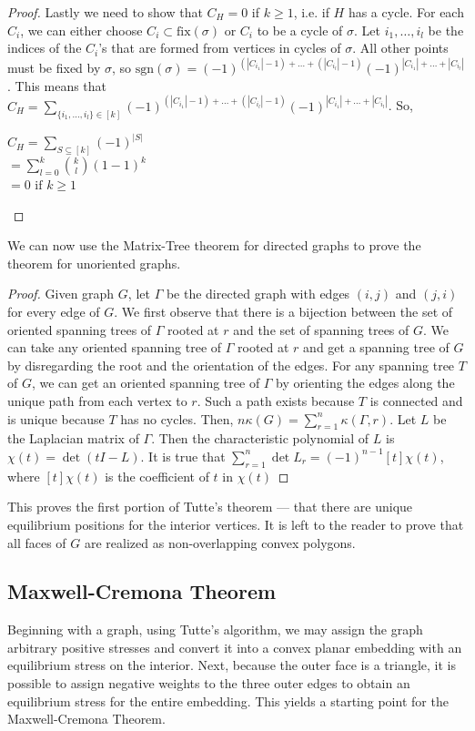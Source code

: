 \documentclass[11pt]{article}
\theoremstyle{definition}
\begin{document}
\begin{proof}
		Lastly we need to show that $C_H = 0$ if $k \geq 1$, i.e. if $H$ has a cycle. 
		For each $C_i$, we can either choose $C_i \subset \text{fix}(\sigma)$ or $C_i$ to be a cycle of $\sigma$. 
		Let $i_1, \dots, i_l$ be the indices of the $C_i$'s that are formed from vertices in cycles of $\sigma$. 
		All other points must be fixed by $\sigma$, so $\text{sgn}(\sigma) = (-1)^{(|C_{i_1}| -1) + \dots + (|C_{i_l}| -1)} (-1)^{|C_{i_1}| + \dots + |C_{i_l}|}$.
		This means that $C_H = \sum_{\{i_1, \dots, i_l\} \in [k]} (-1)^{(|C_{i_1}| -1) + \dots + (|C_{i_l}| -1)} (-1)^{|C_{i_1}| + \dots + |C_{i_l}|}$.
		So, 
		\begin{center}
			$C_H = \sum_{S \subseteq [k]}(-1)^{|S|}$ \\
			$ = \sum_{l=0}^{k} {k \choose l} (1-1)^k$ \\
			$ = 0 \text{ if } k \geq 1$
		\end{center}
	\end{proof}
	
	We can now use the Matrix-Tree theorem for directed graphs to prove the theorem for unoriented graphs.
	
	\begin{proof}
		Given graph $G$, let $\Gamma$ be the directed graph with edges $(i,j)$ and $(j,i)$ for every edge of $G$. 
		We first observe that there is a bijection between the set of oriented spanning trees of $\Gamma$ rooted at $r$ and the set of spanning trees of $G$. 
		We can take any oriented spanning tree of $\Gamma$ rooted at $r$ and get a spanning tree of $G$ by disregarding the root and the orientation of the edges. 
		For any spanning tree $T$ of $G$, we can get an oriented spanning tree of $\Gamma$ by orienting the edges along the unique path from each vertex to $r$. 
		Such a path exists because $T$ is connected and is unique because $T$ has no cycles. 
		Then, $n \kappa(G) = \sum_{r=1}^{n} \kappa(\Gamma, r)$.
		Let $L$ be the Laplacian matrix of $\Gamma$.
		Then the characteristic polynomial of $L$ is $\chi(t) = \det(tI - L)$.
		It is true that $\sum_{r=1}^{n} \det L_r = (-1)^{n-1} [t]\chi(t)$, where $[t]\chi(t)$ is the coefficient of $t$ in $\chi(t)$
	\end{proof}
	
	This proves the first portion of Tutte's theorem --- that there are unique equilibrium positions for the interior vertices.
	It is left to the reader to prove that all faces of $G$ are realized as non-overlapping convex polygons. 	
	
	
\subsection{Maxwell-Cremona Theorem}
	Beginning with a graph, using Tutte's algorithm, we may assign the graph arbitrary positive stresses and convert it into a convex planar embedding with an equilibrium stress on the interior. 
	Next, because the outer face is a triangle, it is possible to assign negative weights to the three outer edges to obtain an equilibrium stress for the entire embedding. 
	This yields a starting point for the Maxwell-Cremona Theorem.
\end{document}
